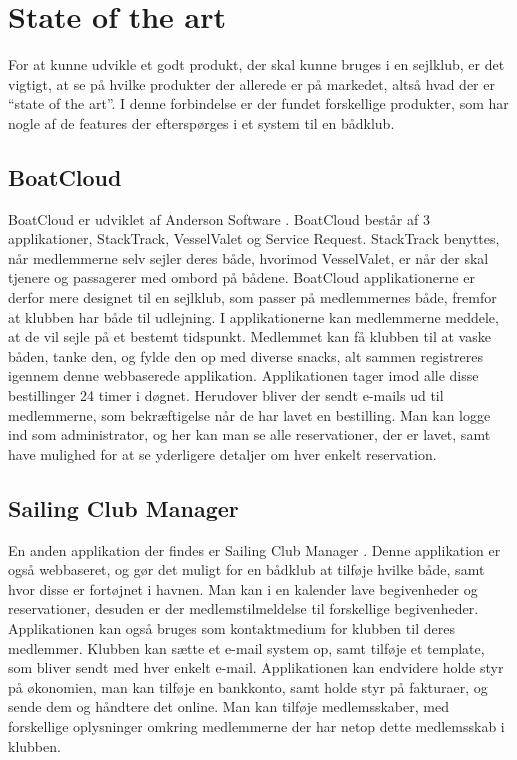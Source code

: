 \section{State of the art}\label{sec:sota}

For at kunne udvikle et godt produkt, der skal kunne bruges i en sejlklub, er det vigtigt, at se på hvilke produkter der allerede er på markedet, altså hvad der er ``state of the art''. 
I denne forbindelse er der fundet forskellige produkter, som har nogle af de features der efterspørges i et system til en bådklub.


\subsection*{BoatCloud}

BoatCloud er udviklet af Anderson Software \citep{BoatCloud}.
BoatCloud består af 3 applikationer, StackTrack, VesselValet og Service Request. 
StackTrack benyttes, når medlemmerne selv sejler deres både, hvorimod VesselValet, er når der skal tjenere og passagerer med ombord på bådene. 
BoatCloud applikationerne er derfor mere designet til en sejlklub, som passer på medlemmernes både, fremfor at klubben har både til udlejning. 
I applikationerne kan medlemmerne meddele, at de vil sejle på et bestemt tidspunkt. 
Medlemmet kan få klubben til at vaske båden, tanke den, og fylde den op med diverse snacks, alt sammen registreres igennem denne webbaserede applikation. 
Applikationen tager imod alle disse bestillinger 24 timer i døgnet. 
Herudover bliver der sendt e-mails ud til medlemmerne, som bekræftigelse når de har lavet en bestilling. 
Man kan logge ind som administrator, og her kan man se alle reservationer, der er lavet, samt have mulighed for at se yderligere detaljer om hver enkelt reservation.


\subsection*{Sailing Club Manager}

En anden applikation der findes er Sailing Club Manager \citep{SailClub}. 
Denne applikation er også webbaseret, og gør det muligt for en bådklub at tilføje hvilke både, samt hvor disse er fortøjnet i havnen. 
Man kan i en kalender lave begivenheder og reservationer, desuden er der medlemstilmeldelse til forskellige begivenheder. Applikationen kan også bruges som kontaktmedium for klubben til deres medlemmer. 
Klubben kan sætte et e-mail system op, samt tilføje et template, som bliver sendt med hver enkelt e-mail.
Applikationen kan endvidere holde styr på økonomien, man kan tilføje en bankkonto, samt holde styr på fakturaer, og sende dem og håndtere det online. 
Man kan tilføje medlemsskaber, med forskellige oplysninger omkring medlemmerne der har netop dette medlemsskab i klubben.

